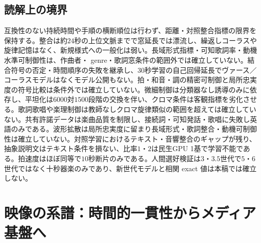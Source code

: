 \documentclass[lualatex,a4paper,10pt]{jlreq}
\begin{document}
\subsection*{読解上の境界}
互換性のない持続時間や手順の横断順位は行わず、距離・対照整合指標の限界を保持する\autocite{btd063,btd065,btd066,btd067,btd068,btd136}。整合は約$24$秒の上位文脈までで窓延長では漂流し、繰返しコーラスや旋律記憶はなく、新規様式への一般化は弱い\autocite{btd063}。長域形式指標・可知歌詞率・動機水準可制御性は、作曲者・ genre・歌詞窓条件の範囲外では確立していない\autocite{btd063,btd065}。結合符号の否定・時間順序の失敗を継承し、$30$秒学習の自己回帰延長でヴァース／コーラスモデルはなくモデル公開もない\autocite{btd065}。拍・和音・調の精密可制御と局所忠実度の符号比較は条件外では確立していない\autocite{btd069}。微細制御は分類器なし誘導のみに依存し、平坦化は$6000$対$1500$段階の交換を伴い、クロマ条件は客観指標を劣化させる\autocite{btd066}。歌詞歌唱や楽理制御は教師なしクロマ旋律類似の範囲を超えては確立していない\autocite{btd066,btd069}。共有許諾データは楽曲品質を制限し、接続詞・可知発話・歌唱に失敗し英語のみである\autocite{btd068}。波形拡散は局所忠実度に留まり長域形式・歌詞整合・動機可制御性は確立していない\autocite{btd064}。対照学習におけるテキスト・音響整合のギャップが残り、抽象説明文はテキスト条件を損ない、比率$1$・$2$は民生GPU 1基で学習不能である\autocite{btd067}。拍速度はほぼ同等で$10$秒断片のみである\autocite{btd069}。人間選好検証は$3$・$3.5$世代で$5$・$6$世代ではなく十秒器楽のみであり、新世代モデルと相関 exact 値は本稿では確立しない\autocite{btd136}。

\section{映像の系譜：時間的一貫性からメディア基盤へ}\label{sec:video}
\end{document}
